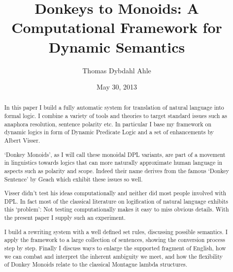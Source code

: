 \documentclass[12pt]{article}
\title{Donkeys to Monoids: A Computational Framework for Dynamic Semantics}
\author{Thomas Dybdahl Ahle}
\date{May 30, 2013}
\begin{document}
\maketitle

\begin{abstract}


In this paper I build a fully automatic system for translation of natural language into formal logic. I combine a variety of tools and theories to target standard issues such as anaphora resolution, sentence polarity etc. In particular I base my framework on dynamic logics in form of Dynamic Predicate Logic and a set of enhancements by Albert Visser\cite{visser1999donkey}.

`Donkey Monoids', as I will call these monoidal DPL variants, are part of a movement in linguistics towards logics that can more naturally approximate human language in aspects such as polarity and scope. Indeed their name derives from the famous `Donkey Sentence' by Geach\cite{geach1962reference} which exhibit these issues so well.

Visser didn't test his ideas computationally and neither did most people involved with DPL. In fact most of the classical literature on logification of natural language exhibits this `problem': Not testing computationally makes it easy to miss obvious details. With the present paper I supply such an experiment.

I build a rewriting system with a well defined set rules, discussing possible semantics. I apply the framework to a large collection of sentences, showing the conversion process step by step. Finally I discuss ways to enlarge the supported fragment of English, how we can combat and interpret the inherent ambiguity we meet, and how the flexibility of Donkey Monoids relate to the classical Montague lambda structures.

\end{abstract}
\end{document}
